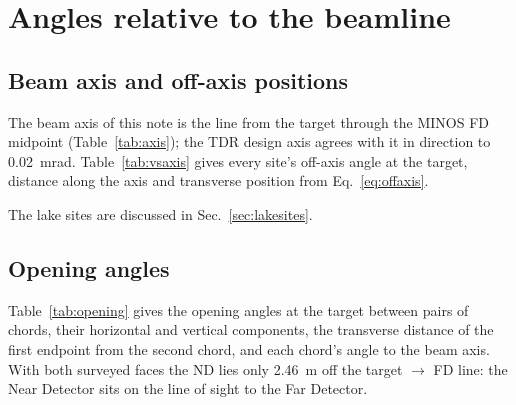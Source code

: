 \documentclass[11pt,letterpaper]{article}
\newcommand{\ND}{ND}
\newcommand{\FD}{FD}
\begin{document}
\section{Angles relative to the beamline}
\subsection{Beam axis and off-axis positions}
The beam axis of this note is the line from the target through the MINOS \FD{} midpoint (Table~\ref{tab:axis}); the TDR design axis agrees with it in direction to \SI{0.02}{mrad}.  Table~\ref{tab:vsaxis} gives every site's off-axis angle at the target, distance along the axis and transverse position from Eq.~\eqref{eq:offaxis}.

\begin{table}[htbp]\centering\small
\caption{The beam axis.}
\label{tab:axis}
\end{table}

\begin{table}[htbp]\centering\small
\caption{Sites relative to the beam axis: off-axis angle at the target, distance along the axis, transverse distance with right/up components, and clock angle (\ang{0} above, \ang{90} right).}
\label{tab:vsaxis}
\end{table}

The lake sites are discussed in Sec.~\ref{sec:lakesites}.

\subsection{Opening angles}
Table~\ref{tab:opening} gives the opening angles at the target between pairs of chords, their horizontal and vertical components, the transverse distance of the first endpoint from the second chord, and each chord's angle to the beam axis.  With both surveyed faces the \ND{} lies only \SI{2.46}{m} off the target $\to$ \FD{} line: the Near Detector sits on the line of sight to the Far Detector.
\end{document}
